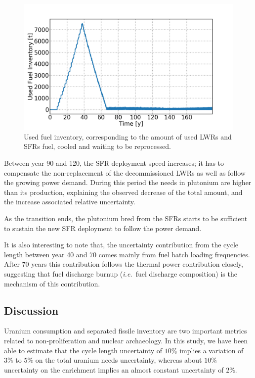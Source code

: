 \documentclass{anstrans}
\newcommand{\ie}{\emph{i.e.\ }}
\begin{document}
\begin{figure}[t] %
    \centering
    \includegraphics[scale=0.16]{used_fuel}
    \caption{Used fuel inventory, corresponding to the amount of used
    \glspl{LWR} and \glspl{SFR} fuel, cooled and waiting to be reprocessed.}
    \label{fig:used_fuel}
\end{figure}

Between year 90 and 120, the \gls{SFR} deployment speed increases; it has to
compensate the non-replacement of the decommissioned \glspl{LWR} as well as
follow the growing power demand.  During this period the needs in plutonium are
higher than its production, explaining the observed decrease of the total
amount, and the increase associated relative uncertainty.

As the transition ends, the plutonium bred from the \glspl{SFR} starts to be
sufficient to sustain the new \gls{SFR} deployment to follow the power demand.

It is also interesting to note that, the uncertainty contribution from the cycle
length between year 40 and 70 comes mainly from fuel batch loading frequencies.
After 70 years this contribution follows the thermal power contribution closely,
suggesting that fuel discharge burnup (\ie fuel discharge composition) is the
mechanism of this contribution.


\subsection{Discussion}

Uranium consumption and separated fissile inventory are two important metrics
related to non-proliferation and nuclear archaeology.  In this study, we have
been able to estimate that the cycle length uncertainty of $10\%$ implies a
variation of $3\%$ to $5\%$ on the total uranium needs uncertainty, whereas
about $10\%$ uncertainty on the enrichment implies an almost constant
uncertainty of $2\%$.
\end{document}
